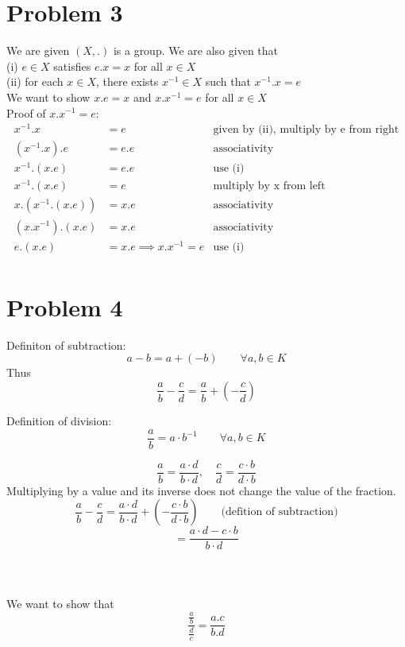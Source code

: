 \documentclass{article}
\begin{document}
\section*{Problem 3}
We are given \((X, .)\) is a group. We are also given that \\
(i) \(e \in X\) satisfies \(e.x = x\) for all \(x \in X\) \\
(ii) for each \(x \in X\), there exists \(x^{-1} \in X\) such that \(x^{-1}.x = e\) \\

We want to show \(x.e = x\) and \(x.x^{-1} = e\) for all \(x \in X\) \\

Proof of \(x.x^{-1} = e\):
\begin{align*}
   x^{-1}.x &= e & \text{given by (ii), multiply by e from right} \\
   (x^{-1}.x).e &= e.e & \text{associativity} \\
   x^{-1}.(x.e) &= e.e & \text{use (i)} \\
   x^{-1}.(x.e) &= e & \text{multiply by x from left} \\
   x.(x^{-1}.(x.e)) &= x.e & \text{associativity} \\
   (x.x^{-1}).(x.e) &= x.e & \text{associativity} \\
   e.(x.e) &= x.e \implies x.x^{-1} = e & \text{use (i)} \\
\end{align*}

\section*{Problem 4}

Definiton of subtraction:
\[
   a - b = a + (-b) \qquad \forall a,b \in K
\]
Thus
\[
   \frac{a}{b} - \frac{c}{d} = \frac{a}{b} + \left(-\frac{c}{d}\right)
\]

Definition of division:
\[
   \frac{a}{b} = a \cdot b^{-1} \qquad \forall a,b \in K
\]

\[
   \frac{a}{b} = \frac{a \cdot d}{b \cdot d}, \quad \frac{c}{d} = \frac{c \cdot b}{d \cdot b}
\]
Multiplying by a value and its inverse does not change the value of the fraction.
\[
   \frac{a}{b} - \frac{c}{d} = \frac{a \cdot d}{b \cdot d} + \left(-\frac{c \cdot b}{d \cdot b}\right) \qquad \text{(defition of subtraction)}
\]
\[
   = \frac{a \cdot d - c \cdot b}{b \cdot d}
\]
\\
\\
\\
We want to show that
\[
   \frac{\frac{a}{b}}{\frac{d}{c}} = \frac{a.c}{b.d}
\]
\end{document}

